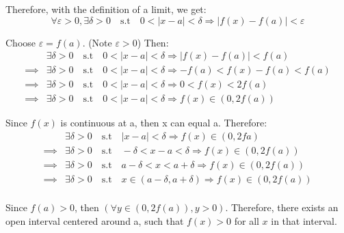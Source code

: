\documentclass[]{article}
\begin{document}
Therefore, with the definition of a limit, we get:
\[
    \forall\varepsilon>0, \exists \delta > 0 \quad \text{s.t} \quad 0 < |x-a| < \delta \Longrightarrow |f(x) - f(a)| < \varepsilon
\]

Choose $\varepsilon = f(a)$. (Note $\varepsilon > 0$) Then:
\begin{align*}
    &\exists \delta > 0 \quad \text{s.t} \quad 0 < |x-a| < \delta \Longrightarrow |f(x) - f(a)| < f(a) \\
    \implies &\exists \delta > 0 \quad \text{s.t} \quad 0 < |x-a| < \delta \Longrightarrow -f(a) < f(x) - f(a) < f(a) \\
    \implies &\exists \delta > 0 \quad \text{s.t} \quad 0 < |x-a| < \delta \Longrightarrow 0 < f(x) < 2f(a) \\
    \implies &\exists \delta > 0 \quad \text{s.t} \quad 0 < |x-a| < \delta \Rightarrow f(x) \in (0, 2f(a))
\end{align*}

Since $f(x)$ is continuous at a, then x can equal a. Therefore:
\begin{align*}
    &\exists \delta > 0 \quad \text{s.t} \quad |x-a| < \delta \Longrightarrow f(x) \in (0, 2fa) \\
    \implies &\exists \delta > 0 \quad \text{s.t} \quad -\delta < x-a < \delta \Longrightarrow f(x) \in (0, 2f(a)) \\
    \implies &\exists \delta > 0 \quad \text{s.t} \quad a-\delta < x < a+\delta \Longrightarrow f(x) \in (0, 2f(a)) \\
    \implies &\exists \delta > 0 \quad \text{s.t} \quad x \in (a - \delta, a + \delta) \Longrightarrow f(x) \in (0, 2f(a)) \\
\end{align*}

Since $f(a) > 0$, then $(\forall y \in (0, 2f(a)), y > 0)$. Therefore, there exists an open interval centered around a, such that
$f(x) > 0$ for all $x$ in that interval.
\end{document}

